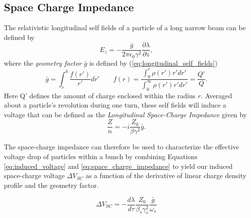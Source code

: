 \subsection{Space Charge Impedance}

The relativistic longitudinal self fields of a particle of a long narrow beam can be defined by \cite{ferrario_space_2014}
$$E_z=-\frac{\bar{g}}{2\pi\epsilon_0\gamma^2}\frac{\partial \lambda}{\partial z},$$
where the \textit{geometry factor} $\bar{g}$ is defined by (\ref{eq:longitudinal_self_fields})
$$\bar{g}=\int_r^b\frac{f(r')}{r'}dr'\qquad f(r)=\frac{\int_0^r\rho(r')r'dr'}{\int_0^\infty\rho(r')r'dr'}=\frac{Q'}{Q}.$$
Here Q' defines the amount of charge enclosed within the radius $r$. Averaged about a particle's revolution during one turn, these self fields will induce a voltage that can be defined as the \textit{Longitudinal Space-Charge Impedance}  given by \cite{lee_accelerator_2004}
\begin{equation}
    \frac{Z}{n} = -i\frac{Z_0}{\beta\gamma^2}\bar{g}
    \label{eq:space_charge_impedance}.
\end{equation}

The space-charge impedance can therefore be used to characterize the effective voltage drop of particles within a bunch by combining Equations \ref{eq:induced_voltage} and  \ref{eq:space_charge_impedance} to yield our induced space-charge voltage $\Delta V_{SC}$ as a function of the derivative of linear charge density profile and the geometry factor.

\begin{equation}
    \Delta V_{SC} = -\frac{d\lambda}{d\tau}\frac{Z_0}{\beta_s\gamma_s^2}\frac{\bar{g}}{\omega_s}
    \label{eq:v_sc}
\end{equation}

